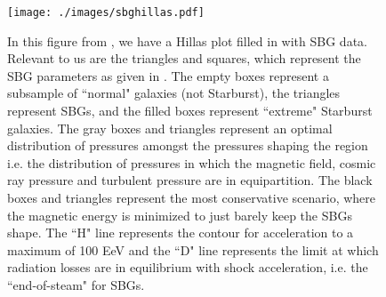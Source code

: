 \begin{figure}[h!]
\centering
\texttt{[image: ./images/sbghillas.pdf]}
\caption[Hillas Diagram for SBGs]{In this figure from , we have a Hillas plot filled in with SBG data. Relevant to us are the triangles and squares, which represent the SBG parameters as given in . The empty boxes represent a subsample of ``normal" galaxies (not Starburst), the triangles represent SBGs, and the filled boxes represent ``extreme" Starburst galaxies. The gray boxes and triangles represent an optimal distribution of pressures amongst the pressures shaping the region i.e. the distribution of pressures in which the magnetic field, cosmic ray pressure and turbulent pressure are in equipartition. The black boxes and triangles represent the most conservative scenario, where the magnetic energy is minimized to just barely keep the SBGs shape. The ``H" line represents the contour for acceleration to a maximum of 100 EeV and the ``D" line represents the limit at which radiation losses are in equilibrium with shock acceleration, i.e. the ``end-of-steam" for SBGs.}
\label{sbghillas}
\end{figure}

